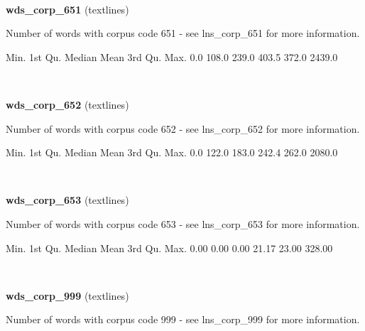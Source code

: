 \documentclass[]{article}
\newenvironment{Shaded}{\begin{snugshade}}{\end{snugshade}}
\newcommand{\FloatTok}[1]{\textcolor[rgb]{0.00,0.00,0.81}{{#1}}}
\newcommand{\NormalTok}[1]{{#1}}
\begin{document}
~

\vspace{1em}

\textbf{wds\_corp\_651} (textlines)

Number of words with corpus code 651 - see lns\_corp\_651 for more
information.

\begin{Shaded}
\begin{Highlighting}[]
   \NormalTok{Min. 1st Qu.  Median    Mean 3rd Qu.    Max. }
    \FloatTok{0.0}   \FloatTok{108.0}   \FloatTok{239.0}   \FloatTok{403.5}   \FloatTok{372.0}  \FloatTok{2439.0} 
\end{Highlighting}
\end{Shaded}

~

\vspace{1em}

\textbf{wds\_corp\_652} (textlines)

Number of words with corpus code 652 - see lns\_corp\_652 for more
information.

\begin{Shaded}
\begin{Highlighting}[]
   \NormalTok{Min. 1st Qu.  Median    Mean 3rd Qu.    Max. }
    \FloatTok{0.0}   \FloatTok{122.0}   \FloatTok{183.0}   \FloatTok{242.4}   \FloatTok{262.0}  \FloatTok{2080.0} 
\end{Highlighting}
\end{Shaded}

~

\vspace{1em}

\textbf{wds\_corp\_653} (textlines)

Number of words with corpus code 653 - see lns\_corp\_653 for more
information.

\begin{Shaded}
\begin{Highlighting}[]
   \NormalTok{Min. 1st Qu.  Median    Mean 3rd Qu.    Max. }
   \FloatTok{0.00}    \FloatTok{0.00}    \FloatTok{0.00}   \FloatTok{21.17}   \FloatTok{23.00}  \FloatTok{328.00} 
\end{Highlighting}
\end{Shaded}

~

\vspace{1em}

\textbf{wds\_corp\_999} (textlines)

Number of words with corpus code 999 - see lns\_corp\_999 for more
information.
\end{document}
